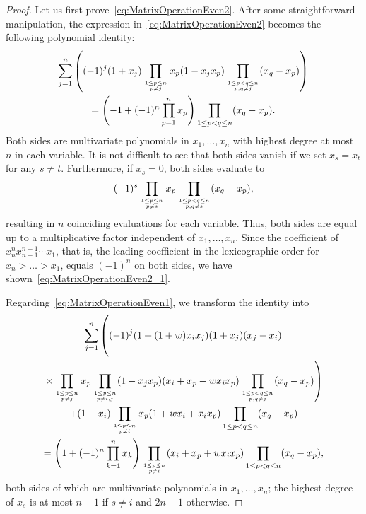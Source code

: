 \documentclass[ALCO, Unicode]{cedram}
\newcommand\myatop[2]{\genfrac{}{}{0pt}{}{#1}{#2}}
\begin{document}
	\begin{proof}
		Let us first prove~\ref{eq:MatrixOperationEven2}. After some straightforward manipulation, the expression in~\ref{eq:MatrixOperationEven2} becomes the following polynomial identity:
		\begin{multline}\label{eq:MatrixOperationEven2_1}
			\sum_{j=1}^{n} \left((-1)^j (1+x_j) \prod_{\myatop{1 \le p \le n}{p \neq j}} x_p(1-x_j x_p) \prod_{\myatop{1 \le p < q\le n}{p,q \neq j}} (x_q - x_p) \right)\\
			=  \left( -1 + (-1)^n \prod_{p=1}^{n} x_p \right)  \prod_{1 \le p < q \le n} (x_q - x_p).
		\end{multline}
		Both sides are multivariate polynomials in $x_1,\dots,x_n$ with highest degree at most $n$ in each variable. It is not difficult to see that both sides vanish if we set $x_s=x_t$ for any $s \neq t$. Furthermore, if $x_s=0$, both sides evaluate to 
		\begin{equation*}
			(-1)^s  \prod_{\myatop{1 \le p \le n}{p \neq s}} x_p \prod_{\myatop{1 \le p < q \le n}{p,q \neq s}} (x_q - x_p),
		\end{equation*}
		resulting in $n$ coinciding evaluations for each variable. Thus, both sides are equal up to a multiplicative factor independent of $x_1,\dots,x_n$. Since the coefficient of $x_n^n x_{n-1}^{n-1} \cdots x_1$, that is, the leading coefficient in the lexicographic order for $x_n > \dots > x_1$, equals $(-1)^n$ on both sides, we have shown~\eqref{eq:MatrixOperationEven2_1}.
		
		Regarding~\ref{eq:MatrixOperationEven1}, we transform the identity into
		\begin{multline}\label{eq:MatrixOperationEven1_1}
			\sum_{j=1}^{n} \left( \vphantom{ \prod_{\myatop{1 \le p < q \le n}{p,q \neq j}}}  (-1)^{j} (1+(1+w) x_i x_j) (1+x_j) (x_j-x_i) \right.\\
			\left. \times \prod_{\myatop{1 \le p \le n}{p \neq j}} x_p \prod_{\myatop{1 \le p \le n}{p \neq i,j}} (1-x_j x_p)  (x_i+x_p+w x_i x_p) \prod_{\myatop{1 \le p < q \le n}{p,q \neq j}} (x_q - x_p) \right) \\
			+ (1-x_i)  \prod\limits_{\myatop{1 \le p \le n}{p \neq i}} x_p (1+ w x_i + x_i x_p) \prod_{1 \le p <q \le n} (x_q -x_p)\\
			= \left(1+ (-1)^n \prod_{k=1}^{n} x_k \right) \prod_{\myatop{1 \le p \le n}{p \neq i}} (x_i+x_p+w x_i x_p) \prod_{1 \le p < q \le n } (x_q -x_p),
		\end{multline}
		both sides of which are multivariate polynomials in $x_1,\dots,x_n$; the highest degree of $x_s$ is at most $n+1$ if $s \neq i$ and $2n-1$ otherwise.
		

\end{proof}
\end{document}
